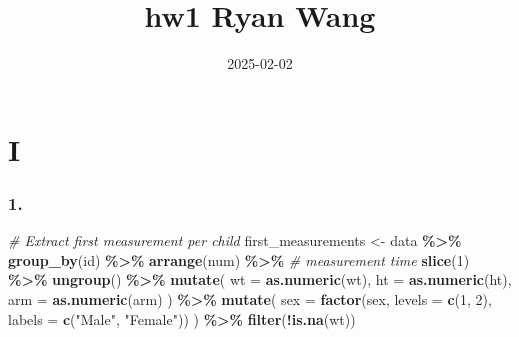 \documentclass[
]{article}
\title{hw1 Ryan Wang}
\author{}
\date{\vspace{-2.5em}2025-02-02}
\newenvironment{Shaded}{\begin{snugshade}}{\end{snugshade}}
\newcommand{\AttributeTok}[1]{\textcolor[rgb]{0.13,0.29,0.53}{#1}}
\newcommand{\CommentTok}[1]{\textcolor[rgb]{0.56,0.35,0.01}{\textit{#1}}}
\newcommand{\DecValTok}[1]{\textcolor[rgb]{0.00,0.00,0.81}{#1}}
\newcommand{\FunctionTok}[1]{\textcolor[rgb]{0.13,0.29,0.53}{\textbf{#1}}}
\newcommand{\NormalTok}[1]{#1}
\newcommand{\OtherTok}[1]{\textcolor[rgb]{0.56,0.35,0.01}{#1}}
\newcommand{\SpecialCharTok}[1]{\textcolor[rgb]{0.81,0.36,0.00}{\textbf{#1}}}
\newcommand{\StringTok}[1]{\textcolor[rgb]{0.31,0.60,0.02}{#1}}
\begin{document}
\maketitle

\section{I}\label{i}

\subsubsection{1.}\label{section}

\begin{Shaded}
\begin{Highlighting}[]
\CommentTok{\# Extract first measurement per child}
\NormalTok{first\_measurements }\OtherTok{\textless{}{-}}\NormalTok{ data }\SpecialCharTok{\%\textgreater{}\%}
  \FunctionTok{group\_by}\NormalTok{(id) }\SpecialCharTok{\%\textgreater{}\%}
  \FunctionTok{arrange}\NormalTok{(num) }\SpecialCharTok{\%\textgreater{}\%}  \CommentTok{\# measurement time}
  \FunctionTok{slice}\NormalTok{(}\DecValTok{1}\NormalTok{) }\SpecialCharTok{\%\textgreater{}\%}
  \FunctionTok{ungroup}\NormalTok{() }\SpecialCharTok{\%\textgreater{}\%}
  \FunctionTok{mutate}\NormalTok{(}
    \AttributeTok{wt =} \FunctionTok{as.numeric}\NormalTok{(wt),}
    \AttributeTok{ht =} \FunctionTok{as.numeric}\NormalTok{(ht),}
    \AttributeTok{arm =} \FunctionTok{as.numeric}\NormalTok{(arm)}
\NormalTok{  ) }\SpecialCharTok{\%\textgreater{}\%}
  \FunctionTok{mutate}\NormalTok{(}
    \AttributeTok{sex =} \FunctionTok{factor}\NormalTok{(sex, }
                 \AttributeTok{levels =} \FunctionTok{c}\NormalTok{(}\DecValTok{1}\NormalTok{, }\DecValTok{2}\NormalTok{), }
                 \AttributeTok{labels =} \FunctionTok{c}\NormalTok{(}\StringTok{"Male"}\NormalTok{, }\StringTok{"Female"}\NormalTok{))}
\NormalTok{  ) }\SpecialCharTok{\%\textgreater{}\%}
  \FunctionTok{filter}\NormalTok{(}\SpecialCharTok{!}\FunctionTok{is.na}\NormalTok{(wt))}



\end{Highlighting}
\end{Shaded}
\end{document}
